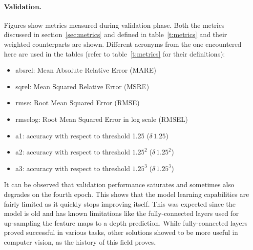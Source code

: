 \paragraph{Validation.}
Figures show metrics measured during validation phase.
Both the metrics discussed in section~\ref{sec:metrics} and defined in table~\ref{t:metrics} and their weighted counterparts are shown.
Different acronyms from the one encountered here are used in the tables (refer to table~\ref{t:metrics} for their definitions):
\begin{itemize}
    \item{abs{\textunderscore}rel: Mean Absolute Relative Error (MARE)}
    \item{sq{\textunderscore}rel: Mean Squared Relative Error (MSRE)}
    \item{rmse: Root Mean Squared Error (RMSE)}
    \item{rmse{\textunderscore}log: Root Mean Squared Error in log scale (RMSEL)}
    \item{a1: accuracy with respect to threshold 1.25 ($\delta \, 1.25$)}
    \item{a2: accuracy with respect to threshold $1.25^{2}$ ($\delta \, 1.25^{2}$)}
    \item{a3: accuracy with respect to threshold $1.25^{3}$ ($\delta \, 1.25^{3}$)}
\end{itemize}
It can be observed that validation performance saturates and sometimes also degrades on the fourth epoch.
This shows that the model learning capabilities are fairly limited as it quickly stops improving itself.
This was expected since the model is old and has known limitations like the fully-connected layers used for up-sampling the feature maps to a depth prediction.
While fully-connected layers proved successful in various tasks, other solutions showed to be more useful in computer vision, as the history of this field proves.

